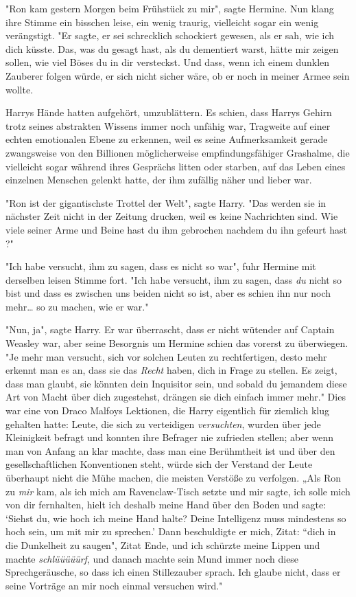 {"Ron kam gestern Morgen beim Frühstück zu mir", sagte Hermine. Nun klang ihre Stimme ein bisschen leise, ein wenig traurig, vielleicht sogar ein wenig verängstigt. "Er sagte, er sei schrecklich schockiert gewesen, als er sah, wie ich dich küsste. Das, was du gesagt hast, als du dementiert warst, hätte mir zeigen sollen, wie viel Böses du in dir versteckst. Und dass, wenn ich einem dunklen Zauberer folgen würde, er sich nicht sicher wäre, ob er noch in meiner Armee sein wollte.

Harrys Hände hatten aufgehört, umzublättern. Es schien, dass Harrys Gehirn trotz seines abstrakten Wissens immer noch unfähig war, Tragweite auf einer echten emotionalen Ebene zu erkennen, weil es seine Aufmerksamkeit gerade zwangsweise von den Billionen möglicherweise empfindungsfähiger Grashalme, die vielleicht sogar während ihres Gesprächs litten oder starben, auf das Leben eines einzelnen Menschen gelenkt hatte, der ihm zufällig näher und lieber war.

"Ron ist der gigantischste Trottel der Welt", sagte Harry. "Das werden sie in nächster Zeit nicht in der Zeitung drucken, weil es keine Nachrichten sind. Wie viele seiner Arme und Beine hast du ihm gebrochen nachdem du ihn gefeurt hast ?"

"Ich habe versucht, ihm zu sagen, dass es nicht so war", fuhr Hermine mit derselben leisen Stimme fort. "Ich habe versucht, ihm zu sagen, dass \emph{du} nicht so bist und dass es zwischen uns beiden nicht so ist, aber es schien ihn nur noch mehr… so zu machen, wie er war."

"Nun, ja", sagte Harry. Er war überrascht, dass er nicht wütender auf Captain Weasley war, aber seine Besorgnis um Hermine schien das vorerst zu überwiegen. "Je mehr man versucht, sich vor solchen Leuten zu rechtfertigen, desto mehr erkennt man es an, dass sie das \emph{Recht} haben, dich in Frage zu stellen. Es zeigt, dass man glaubt, sie könnten dein Inquisitor sein, und sobald du jemandem diese Art von Macht über dich zugestehst, drängen sie dich einfach immer mehr." Dies war eine von Draco Malfoys Lektionen, die Harry eigentlich für ziemlich klug gehalten hatte: Leute, die sich zu verteidigen \emph{versuchten}, wurden über jede Kleinigkeit befragt und konnten ihre Befrager nie zufrieden stellen; aber wenn man von Anfang an klar machte, dass man eine Berühmtheit ist und über den gesellschaftlichen Konventionen steht, würde sich der Verstand der Leute überhaupt nicht die Mühe machen, die meisten Verstöße zu verfolgen. „Als Ron zu \emph{mir} kam, als ich mich am Ravenclaw-Tisch setzte und mir sagte, ich solle mich von dir fernhalten, hielt ich deshalb meine Hand über den Boden und sagte: `Siehst du, wie hoch ich meine Hand halte? Deine Intelligenz muss mindestens so hoch sein, um mit mir zu sprechen.' Dann beschuldigte er mich, Zitat: “dich in die Dunkelheit zu saugen", Zitat Ende, und ich schürzte meine Lippen und machte \emph{schlüüüüürf}, und danach machte sein Mund immer noch diese Sprechgeräusche, so dass ich einen Stillezauber sprach. Ich glaube nicht, dass er seine Vorträge an mir noch einmal versuchen wird."

}
